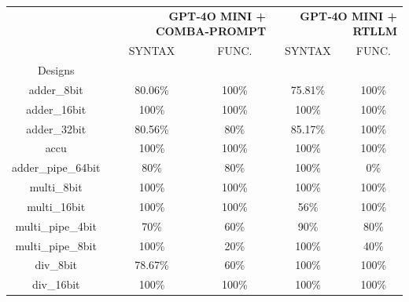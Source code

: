 \begin{tabular}{c|cc|cc}
\toprule
 & \multicolumn{2}{r}{\bfseries GPT‑4O MINI + COMBA-PROMPT } & \multicolumn{2}{r}{\bfseries GPT‑4O MINI + RTLLM } \\
 & SYNTAX & FUNC. & SYNTAX & FUNC. \\
Designs &  &  &  &  \\
\midrule
adder\_8bit & \color{black} {\cellcolor{lightblue}} 80.06\% & \color{black} {\cellcolor{lightgreen}} 100\% & 75.81\% & \color{black} {\cellcolor{lightgreen}} 100\% \\ \midrule
adder\_16bit & \color{black} {\cellcolor{lightblue}} 100\% & \color{black} {\cellcolor{lightgreen}} 100\% & \color{black} {\cellcolor{lightblue}} 100\% & \color{black} {\cellcolor{lightgreen}} 100\% \\ \midrule
adder\_32bit & 80.56\% & 80\% & \color{black} {\cellcolor{lightblue}} 85.17\% & \color{black} {\cellcolor{lightgreen}} 100\% \\ \midrule
accu & \color{black} {\cellcolor{lightblue}} 100\% & \color{black} {\cellcolor{lightgreen}} 100\% & \color{black} {\cellcolor{lightblue}} 100\% & \color{black} {\cellcolor{lightgreen}} 100\% \\ \midrule
adder\_pipe\_64bit & 80\% & \color{black} {\cellcolor{lightgreen}} 80\% & \color{black} {\cellcolor{lightblue}} 100\% & 0\% \\ \midrule
multi\_8bit & \color{black} {\cellcolor{lightblue}} 100\% & \color{black} {\cellcolor{lightgreen}} 100\% & \color{black} {\cellcolor{lightblue}} 100\% & \color{black} {\cellcolor{lightgreen}} 100\% \\ \midrule
multi\_16bit & \color{black} {\cellcolor{lightblue}} 100\% & \color{black} {\cellcolor{lightgreen}} 100\% & 56\% & \color{black} {\cellcolor{lightgreen}} 100\% \\ \midrule
multi\_pipe\_4bit & 70\% & 60\% & \color{black} {\cellcolor{lightblue}} 90\% & \color{black} {\cellcolor{lightgreen}} 80\% \\ \midrule
multi\_pipe\_8bit & \color{black} {\cellcolor{lightblue}} 100\% & 20\% & \color{black} {\cellcolor{lightblue}} 100\% & \color{black} {\cellcolor{lightgreen}} 40\% \\ \midrule
div\_8bit & 78.67\% & 60\% & \color{black} {\cellcolor{lightblue}} 100\% & \color{black} {\cellcolor{lightgreen}} 100\% \\ \midrule
div\_16bit & \color{black} {\cellcolor{lightblue}} 100\% & \color{black} {\cellcolor{lightgreen}} 100\% & \color{black} {\cellcolor{lightblue}} 100\% & \color{black} {\cellcolor{lightgreen}} 100\% \\ \midrule

\end{tabular}
